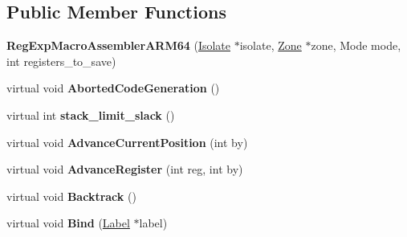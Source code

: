 \subsection*{Public Member Functions}
\begin{DoxyCompactItemize}
\item 
{\bfseries Reg\+Exp\+Macro\+Assembler\+A\+R\+M64} (\hyperlink{classv8_1_1internal_1_1_isolate}{Isolate} $\ast$isolate, \hyperlink{classv8_1_1internal_1_1_zone}{Zone} $\ast$zone, Mode mode, int registers\+\_\+to\+\_\+save)\hypertarget{classv8_1_1internal_1_1_reg_exp_macro_assembler_a_r_m64_a7d51531c070c825ebe027f0e464c13fe}{}\label{classv8_1_1internal_1_1_reg_exp_macro_assembler_a_r_m64_a7d51531c070c825ebe027f0e464c13fe}

\item 
virtual void {\bfseries Aborted\+Code\+Generation} ()\hypertarget{classv8_1_1internal_1_1_reg_exp_macro_assembler_a_r_m64_afb87ede3a4d93841dd3fe00cb54823df}{}\label{classv8_1_1internal_1_1_reg_exp_macro_assembler_a_r_m64_afb87ede3a4d93841dd3fe00cb54823df}

\item 
virtual int {\bfseries stack\+\_\+limit\+\_\+slack} ()\hypertarget{classv8_1_1internal_1_1_reg_exp_macro_assembler_a_r_m64_a89da264dd8281d69aa8888ca3708da7b}{}\label{classv8_1_1internal_1_1_reg_exp_macro_assembler_a_r_m64_a89da264dd8281d69aa8888ca3708da7b}

\item 
virtual void {\bfseries Advance\+Current\+Position} (int by)\hypertarget{classv8_1_1internal_1_1_reg_exp_macro_assembler_a_r_m64_a7507f75eb20b15459072c267cee4c451}{}\label{classv8_1_1internal_1_1_reg_exp_macro_assembler_a_r_m64_a7507f75eb20b15459072c267cee4c451}

\item 
virtual void {\bfseries Advance\+Register} (int reg, int by)\hypertarget{classv8_1_1internal_1_1_reg_exp_macro_assembler_a_r_m64_aa3ba92e18353224c167b57f811ddb66a}{}\label{classv8_1_1internal_1_1_reg_exp_macro_assembler_a_r_m64_aa3ba92e18353224c167b57f811ddb66a}

\item 
virtual void {\bfseries Backtrack} ()\hypertarget{classv8_1_1internal_1_1_reg_exp_macro_assembler_a_r_m64_a875d7462d677cb0c32762c248733f499}{}\label{classv8_1_1internal_1_1_reg_exp_macro_assembler_a_r_m64_a875d7462d677cb0c32762c248733f499}

\item 
virtual void {\bfseries Bind} (\hyperlink{classv8_1_1internal_1_1_label}{Label} $\ast$label)\hypertarget{classv8_1_1internal_1_1_reg_exp_macro_assembler_a_r_m64_a596ab0b9f46512e4aa849b9ad71b5fab}{}\label{classv8_1_1internal_1_1_reg_exp_macro_assembler_a_r_m64_a596ab0b9f46512e4aa849b9ad71b5fab}


\end{DoxyCompactItemize}
